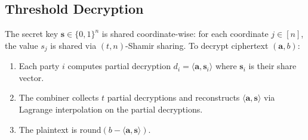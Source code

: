 \subsection{Threshold Decryption}

\begin{definition}
\label{def:threshold-dec}
The secret key $\mathbf{s} \in \{0,1\}^n$ is shared coordinate-wise:
for each coordinate $j \in [n]$, the value $s_j$ is shared via
$(t, n)$-Shamir sharing.  To decrypt ciphertext $(\mathbf{a}, b)$:
\begin{enumerate}[nosep]
  \item Each party $i$ computes partial decryption
        $d_i = \langle \mathbf{a}, \mathbf{s}_i \rangle$ where
        $\mathbf{s}_i$ is their share vector.
  \item The combiner collects $t$ partial decryptions and reconstructs
        $\langle \mathbf{a}, \mathbf{s} \rangle$ via Lagrange
        interpolation on the partial decryptions.
  \item The plaintext is $\text{round}(b - \langle \mathbf{a},
        \mathbf{s} \rangle)$.
\end{enumerate}
\end{definition}

